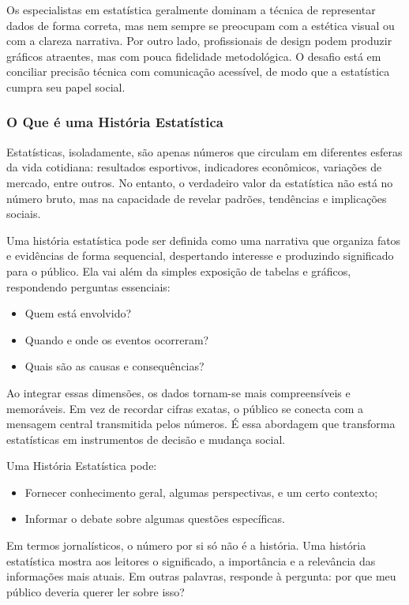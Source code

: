 Os especialistas em estatística geralmente dominam a técnica de representar dados de forma correta, mas nem sempre se preocupam com a estética visual ou com a clareza narrativa. Por outro lado, profissionais de design podem produzir gráficos atraentes, mas com pouca fidelidade metodológica. O desafio está em conciliar precisão técnica com comunicação acessível, de modo que a estatística cumpra seu papel social.

\subsubsection{O Que é uma História Estatística}

Estatísticas, isoladamente, são apenas números que circulam em diferentes esferas da vida cotidiana: resultados esportivos, indicadores econômicos, variações de mercado, entre outros. No entanto, o verdadeiro valor da estatística não está no número bruto, mas na capacidade de revelar padrões, tendências e implicações sociais.


\newpage
Uma história estatística pode ser definida como uma narrativa que organiza fatos e evidências de forma sequencial, despertando interesse e produzindo significado para o público. Ela vai além da simples exposição de tabelas e gráficos, respondendo perguntas essenciais:

\begin{itemize}
    \item Quem está envolvido?
    \item Quando e onde os eventos ocorreram?
    \item Quais são as causas e consequências?
\end{itemize}

Ao integrar essas dimensões, os dados tornam-se mais compreensíveis e memoráveis. Em vez de recordar cifras exatas, o público se conecta com a mensagem central transmitida pelos números. É essa abordagem que transforma estatísticas em instrumentos de decisão e mudança social. \vskip0.3cm 

Uma História Estatística pode:

\begin{itemize}
    \item Fornecer conhecimento geral, algumas perspectivas, e um certo contexto;
    \item Informar o debate sobre algumas questões específicas.
\end{itemize}

Em termos jornalísticos, o número por si só não é a história. Uma história estatística mostra aos leitores o significado, a importância e a relevância das informações mais atuais. Em outras palavras, responde à pergunta: por que meu público deveria querer ler sobre isso?\vskip0.3cm 

